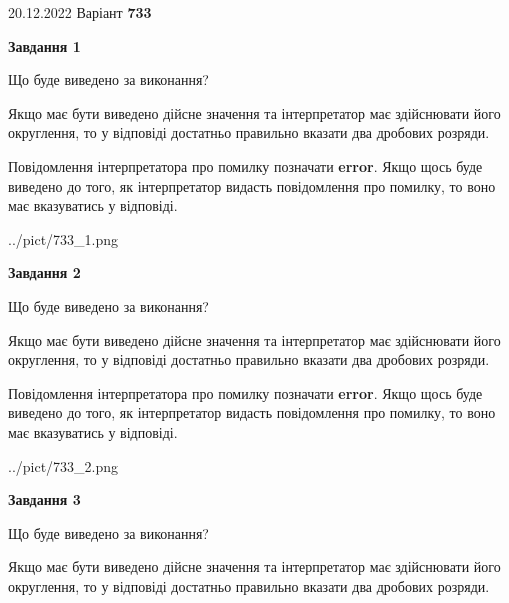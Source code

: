 \documentclass[12pt, ukrainian]{article}
\begin{document}
{20.12.2022 Варіант \No \textbf { 733 }\par}
{
\begin {Large}

{\begin {center}\textbf{Завдання 1}\end {center}}\par
Що буде виведено за виконання? \par

Якщо має бути виведено дійсне значення та інтерпретатор має здійснювати його округлення, 
то у відповіді достатньо правильно вказати два дробових розряди.

Повідомлення інтерпретатора про помилку позначати \textbf{error}.
Якщо щось буде виведено до того, як інтерпретатор видасть повідомлення про помилку, 
то воно має вказуватись у відповіді. \par

\begin{center}
	{../pict/733_1.png}
\end{center}
\newpage

{\begin {center}\textbf{Завдання 2}\end {center}}\par
Що буде виведено за виконання? \par

Якщо має бути виведено дійсне значення та інтерпретатор має здійснювати його округлення, 
то у відповіді достатньо правильно вказати два дробових розряди.

Повідомлення інтерпретатора про помилку позначати \textbf{error}.
Якщо щось буде виведено до того, як інтерпретатор видасть повідомлення про помилку, 
то воно має вказуватись у відповіді. \par

\begin{center}
	{../pict/733_2.png}
\end{center}
\newpage

{\begin {center}\textbf{Завдання 3}\end {center}}\par
Що буде виведено за виконання? \par

Якщо має бути виведено дійсне значення та інтерпретатор має здійснювати його округлення, 
то у відповіді достатньо правильно вказати два дробових розряди.


\end{Large}}
\end{document}
